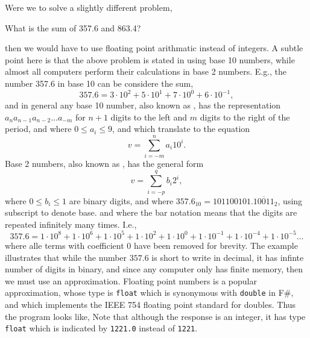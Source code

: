 Were we to solve a slightly different problem,
\begin{problem}
  What is the sum of 357.6 and 863.4?
\end{problem}
then we would have to use floating point arithmatic instead of integers. A subtle point here is that the above problem is stated in using base 10 numbers, while almost all computers perform their calculations in base 2 numbers. E.g., the number 357.6 in base 10 can be considere the sum,
\begin{equation}
  357.6 = 3\cdot 10^2 + 5\cdot 10^1 + 7\cdot 10^0 + 6\cdot 10^{-1},
\end{equation}
and in general any base 10 number, also known as , has the representation $a_n a_{n-1} a_{n-2} \dots a_{-m}$ for $n+1$ digits to the left and $m$ digits to the right of the period, and where $0 \leq a_i \leq 9$, and which translate to the equation
\begin{equation}
  v = \sum_{i=-m}^{n} a_i10^i.
\end{equation}
Base 2 numbers, also known as , has the general form
\begin{equation}
  v = \sum_{i=-p}^{q} b_i2^i,
\end{equation}
where $0 \leq b_i \leq 1$ are binary digits, and where $357.6_{10} = 101100101.\overline{10011}_2$, using subscript to denote base. and where the bar notation means that the digits are repeated infinitely many times. I.e.,
\begin{equation}
  357.6 = 1\cdot 10^8  + 1\cdot 10^6 + 1\cdot 10^5 + 1\cdot 10^2 + 1\cdot 10^0 + 1\cdot 10^{-1} + 1\cdot 10^{-4} + 1\cdot 10^{-5}\dots 
\end{equation}
where alle terms with coefficient 0 have been removed for brevity. The example illustrates that while the number $357.6$ is short to write in decimal, it has infinte number of digits in binary, and since any computer only has finite memory, then we must use an approximation. Floating point numbers is a popular approximation, whose type is \lstinline|float| which is synonymous with \lstinline|double| in F\#, and which implements the IEEE 754 floating point standard for doubles. Thus the program looks like,
Note that although the response is an integer, it has type \lstinline|float| which is indicated by \lstinline|1221.0| instead of \lstinline|1221|.

